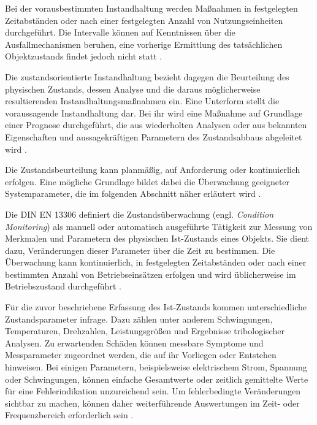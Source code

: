 Bei der vorausbestimmten Instandhaltung werden Maßnahmen in festgelegten Zeitabständen oder
nach einer festgelegten Anzahl von Nutzungseinheiten durchgeführt. Die Intervalle können auf
Kenntnissen über die Ausfallmechanismen beruhen, eine vorherige Ermittlung des tatsächlichen
Objektzustands findet jedoch nicht statt \cite[S.~35, Abschn.~7.2]{zotero-item-24}.

Die zustandsorientierte Instandhaltung bezieht dagegen die Beurteilung des physischen Zustands,
dessen Analyse und die daraus möglicherweise resultierenden Instandhaltungsmaßnahmen ein.
Eine Unterform stellt die voraussagende Instandhaltung dar. Bei ihr wird eine Maßnahme auf
Grundlage einer Prognose durchgeführt, die aus wiederholten Analysen oder aus bekannten
Eigenschaften und aussagekräftigen Parametern des Zustandsabbaus abgeleitet wird
\cite[S.~35, Abschn.~7.4]{zotero-item-24}.

Die Zustandsbeurteilung kann planmäßig, auf Anforderung oder kontinuierlich erfolgen. Eine
mögliche Grundlage bildet dabei die Überwachung geeigneter Systemparameter, die im folgenden
Abschnitt näher erläutert wird
\cite[S.~35, Abschn.~7.3]{zotero-item-24}.


Die DIN EN 13306 definiert die Zustandsüberwachung (engl. \emph{Condition Monitoring}) als
manuell oder automatisch ausgeführte Tätigkeit zur Messung von Merkmalen und Parametern des
physischen Ist-Zustands eines Objekts. Sie dient dazu, Veränderungen dieser Parameter über
die Zeit zu bestimmen. Die Überwachung kann kontinuierlich, in festgelegten Zeitabständen
oder nach einer bestimmten Anzahl von Betriebseinsätzen erfolgen und wird üblicherweise im
Betriebszustand durchgeführt \cite[S.~41--42, Abschn.~8.2]{zotero-item-24}.

Für die zuvor beschriebene Erfassung des Ist-Zustands kommen
unterschiedliche Zustandsparameter infrage. Dazu zählen unter anderem Schwingungen,
Temperaturen, Drehzahlen, Leistungsgrößen und Ergebnisse tribologischer Analysen.
Zu erwartenden Schäden
können messbare Symptome und Messparameter zugeordnet werden, die auf ihr Vorliegen oder
Entstehen hinweisen. Bei einigen Parametern, beispielsweise elektrischem Strom, Spannung oder
Schwingungen, können einfache Gesamtwerte oder zeitlich gemittelte Werte für eine
Fehlerindikation unzureichend sein. Um fehlerbedingte Veränderungen sichtbar zu machen,
können daher weiterführende Auswertungen im Zeit- oder Frequenzbereich erforderlich sein
\cite[S.~8 und S.~13, Abschn.~7.3 und 8.1]{zotero-item-32}.

